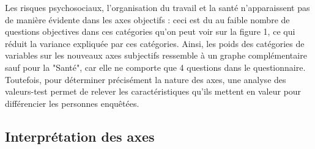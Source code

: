 \documentclass[11pt,fleqn,a4paper,openany,frenchb]{book} %
\begin{document}
Les risques psychosociaux, l'organisation du travail et la santé n'apparaissent pas de manière évidente dans les axes objectifs : ceci est du au faible nombre de questions objectives dans ces catégories qu'on peut voir sur la figure 1, ce qui réduit la variance expliquée par ces catégories. Ainsi, les poids des catégories de variables sur les nouveaux axes subjectifs ressemble à un graphe complémentaire sauf pour la "Santé", car elle ne comporte que 4 questions dans le questionnaire. Toutefois, pour déterminer précisément la nature des axes, une analyse des valeurs-test permet de relever les caractéristiques qu'ils mettent en valeur pour différencier les personnes enquêtées.%

\subsection{Interprétation des axes}
\end{document}
